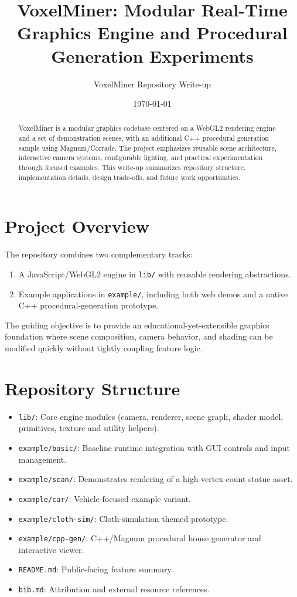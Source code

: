 \documentclass[11pt]{article}
\title{VoxelMiner: Modular Real-Time Graphics Engine and Procedural Generation Experiments}
\author{VoxelMiner Repository Write-up}
\date{\today}
\begin{document}
\maketitle

\begin{abstract}
VoxelMiner is a modular graphics codebase centered on a WebGL2 rendering engine and a set of demonstration scenes, with an additional C++ procedural generation sample using Magnum/Corrade. The project emphasizes reusable scene architecture, interactive camera systems, configurable lighting, and practical experimentation through focused examples. This write-up summarizes repository structure, implementation details, design trade-offs, and future work opportunities.
\end{abstract}

\section{Project Overview}

The repository combines two complementary tracks:
\begin{enumerate}[leftmargin=*]
  \item A JavaScript/WebGL2 engine in \texttt{lib/} with reusable rendering abstractions.
  \item Example applications in \texttt{example/}, including both web demos and a native C++ procedural-generation prototype.
\end{enumerate}

The guiding objective is to provide an educational-yet-extensible graphics foundation where scene composition, camera behavior, and shading can be modified quickly without tightly coupling feature logic.

\section{Repository Structure}

\begin{itemize}[leftmargin=*]
  \item \texttt{lib/}: Core engine modules (camera, renderer, scene graph, shader model, primitives, texture and utility helpers).
  \item \texttt{example/basic/}: Baseline runtime integration with GUI controls and input management.
  \item \texttt{example/scan/}: Demonstrates rendering of a high-vertex-count statue asset.
  \item \texttt{example/car/}: Vehicle-focused example variant.
  \item \texttt{example/cloth-sim/}: Cloth-simulation themed prototype.
  \item \texttt{example/cpp-gen/}: C++/Magnum procedural house generator and interactive viewer.
  \item \texttt{README.md}: Public-facing feature summary.
  \item \texttt{bib.md}: Attribution and external resource references.
\end{itemize}
\end{document}
